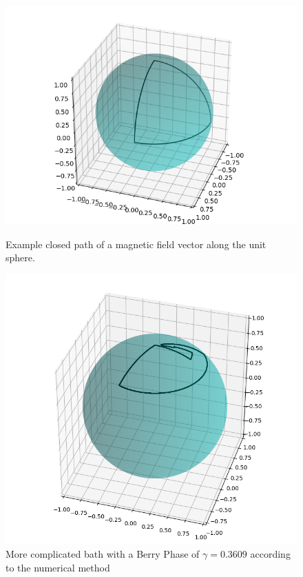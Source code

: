 \documentclass{article}
\begin{document}
\begin{figure}
  \begin{minipage}{.48\textwidth}
    \centering
    \label{fig:berry_path}
    \includegraphics[width=\textwidth]{berry_phase_path_90_90_-90_256.png}
    \caption{Example closed path of a magnetic field vector along the unit sphere.}
  \end{minipage}%
  \hspace{2ex}
  \begin{minipage}{.40\textwidth}
    \centering
    \includegraphics[width=\textwidth]{berry_phase_random_path.png}
    \caption{More complicated bath with a Berry Phase of $\gamma = 0.3609$ according to the numerical method}
    \label{fig:berry_path_random}
  \end{minipage}
\end{figure}
\end{document}
